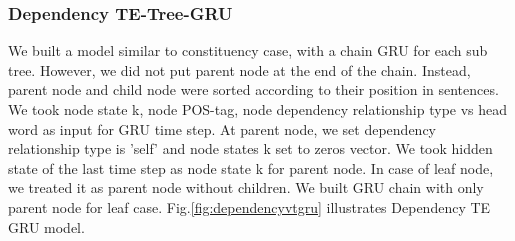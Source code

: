 \subsubsection{Dependency TE-Tree-GRU} \label{sec:VTtreeDependency}
We built a model similar to constituency case, with a chain GRU for each sub tree. However, we did not put parent node at the end of the chain. Instead, parent node and child node were sorted according to their position in sentences. We took node state k, node POS-tag, node dependency relationship type vs head word as input for GRU time step. At parent node, we set dependency relationship type is 'self' and node states k set to zeros vector. We took hidden state of the last time step as node state k for parent node. In case of leaf node, we treated it as parent node without children. We built GRU chain with only parent node for leaf case. Fig.\ref{fig:dependencyvtgru} illustrates Dependency TE GRU model.


